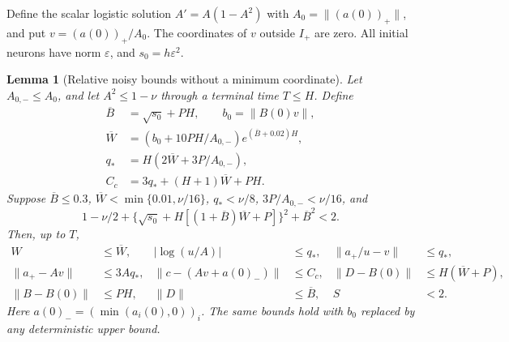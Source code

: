 \documentclass[11pt]{article}
\newtheorem{lemma}[theorem]{Lemma}
\theoremstyle{remark}
\begin{document}
Define the scalar logistic solution $A'=A(1-A^2)$ with
$A_0=\|(a(0))_+\|$, and put $v=(a(0))_+/A_0$.
The coordinates of $v$ outside $I_+$ are zero. All initial neurons have
norm $\varepsilon$, and $s_0=h\varepsilon^2$.

\begin{lemma}[Relative noisy bounds without a minimum coordinate]
\label{sbwide:relative}
Let $A_{0,-}\le A_0$, and let $A^2\le1-\nu$ through a terminal time
$T\le H$. Define
\begin{align*}
 \overline B&=\sqrt{s_0}+PH,\qquad b_0=\|B(0)v\|,\\
 \overline W&=(b_0+10PH/A_{0,-})e^{(\overline B+0.02)H},\\
 q_*&=H(2\overline W+3P/A_{0,-}),\\
 C_c&=3q_*+(H+1)\overline W+PH.
\end{align*}
Suppose $\overline B\le0.3$, $\overline W<\min\{0.01,\nu/16\}$,
$q_*<\nu/8$, $3P/A_{0,-}<\nu/16$, and
\begin{equation}\label{sbwide:mass-stop}
 1-\nu/2+
 \{\sqrt{s_0}+H[(1+\overline B)\overline W+P]\}^2
 +\overline B^2<2.
\end{equation}
Then, up to $T$,
\begin{align}\label{sbwide:relative-bounds}
 W&\le\overline W,& |\log(u/A)|&\le q_*,&
 \|a_+/u-v\|&\le q_*,\\
 \|a_+-Av\|&\le3Aq_*,&
 \|c-(Av+a(0)_-)\|&\le C_c,&
 \|D-B(0)\|&\le H(\overline W+P),\nonumber\\
 \|B-B(0)\|&\le PH,&\|D\|&\le\overline B,& S&<2.\nonumber
\end{align}
Here $a(0)_-=(\min(a_i(0),0))_i$. The same bounds hold with $b_0$
replaced by any deterministic upper bound.
\end{lemma}
\end{document}
